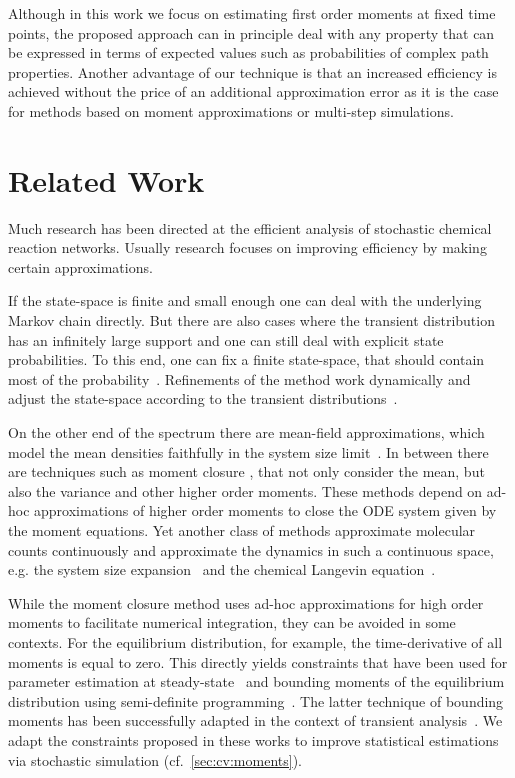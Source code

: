Although in this work we focus on  estimating first order moments at
fixed time points, the proposed approach can in principle deal with any property that can
be expressed in terms of expected values such as probabilities
of complex path properties.
Another advantage of our technique is that an increased efficiency is achieved without the price of an additional approximation error as it is the case for methods based on moment approximations or multi-step simulations.

\section{Related Work}\label{sec:cv:related}
Much research has been directed at the efficient analysis of stochastic chemical reaction
networks.
Usually research focuses on improving efficiency by making certain approximations.

If the state-space is finite and small enough one can deal with the underlying Markov
chain directly.
But there are also  cases where the transient distribution has an infinitely large support
and one can still deal with explicit state probabilities.
To this end, one can fix a finite state-space, that should contain most of the
probability~\cite{munsky2006finite}. Refinements of the method work
dynamically and adjust the state-space according to the transient
distributions~\cite{andreychenko2011parameter,henzinger2009sliding,mateescu2010fast}.

On the other end of the spectrum there are mean-field approximations, 
which model the mean densities faithfully in the system size limit~\cite{bortolussi2013continuous}.
In between there are techniques such as moment closure \cite{singh2006lognormal}, that
not only consider the mean, but also the variance and other higher order moments.
These methods depend on ad-hoc approximations of higher order moments to
close the \ac{ODE} system given by the moment equations.
Yet another class of methods approximate molecular counts continuously and approximate the dynamics in such a continuous space, e.g. the system size expansion~\cite{van1992stochastic} and the
chemical Langevin equation~\cite{gillespie2000chemical}.

While the moment closure method uses ad-hoc approximations for high order moments to
facilitate numerical integration, they can be avoided in some contexts.
For the equilibrium distribution, for example, the time-derivative of all moments is equal to zero.
This directly yields constraints that have been used for parameter estimation at
steady-state~\cite{backenkohler2018moment}
and bounding moments of the equilibrium distribution using semi-definite
programming~\cite{ghusinga2017estimating,ghusinga2017exact,kuntz2017rigorous}.
The latter technique of bounding moments has been successfully adapted in the 
context of transient analysis~\cite{dowdy2018dynamic,sakurai2017convex,sakurai2019bounding}.
We adapt the constraints proposed in these works to improve statistical estimations via stochastic
simulation (cf.\ \autoref{sec:cv:moments}).

